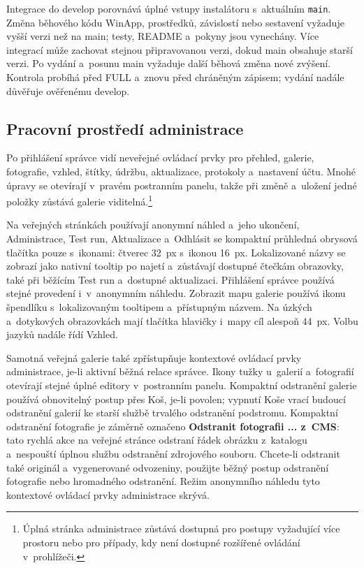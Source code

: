 \documentclass[11pt,a4paper]{article}
\newcommand{\ui}[1]{\textbf{#1}}
\begin{document}
Integrace do develop porovnává úplné vstupy instalátoru s~aktuálním
\texttt{main}. Změna běhového kódu WinApp, prostředků, závislostí nebo sestavení
vyžaduje vyšší verzi než na main; testy, README a~pokyny jsou vynechány.
Více integrací může zachovat stejnou připravovanou verzi, dokud main obsahuje
starší verzi. Po vydání a~posunu main vyžaduje další běhová změna nové zvýšení.
Kontrola probíhá před FULL a~znovu před chráněným zápisem; vydání nadále
důvěřuje
ověřenému develop.

\subsection{Pracovní prostředí administrace}

Po přihlášení správce vidí neveřejné ovládací prvky pro přehled, galerie,
fotografie, vzhled, štítky, údržbu, aktualizace, protokoly a~nastavení účtu.
Mnohé úpravy se otevírají v~pravém postranním panelu, takže při změně a~uložení
jedné položky zůstává galerie viditelná.\footnote{Úplná stránka administrace
zůstává dostupná pro postupy vyžadující více prostoru nebo pro případy, kdy není
dostupné rozšířené ovládání v~prohlížeči.}

Na veřejných stránkách používají anonymní náhled a~jeho ukončení, Administrace,
Test run, Aktualizace a~Odhlásit se kompaktní průhledná obrysová tlačítka pouze
s~ikonami: čtverec 32~px s~ikonou 16~px. Lokalizované názvy se zobrazí jako
nativní tooltip po najetí a~zůstávají dostupné čtečkám obrazovky, také při
běžícím
Test run a~dostupné aktualizaci. Přihlášení správce používá stejné provedení
i~v~anonymním náhledu. Zobrazit mapu galerie používá ikonu špendlíku
s~lokalizovaným tooltipem a~přístupným názvem. Na úzkých a~dotykových
obrazovkách
mají tlačítka hlavičky i~mapy cíl alespoň 44~px. Volbu jazyků nadále řídí
Vzhled.

Samotná veřejná galerie také zpřístupňuje kontextové ovládací prvky
administrace, je-li aktivní běžná relace správce. Ikony tužky u~galerií
a~fotografií otevírají stejné úplné editory v~postranním panelu. Kompaktní
odstranění galerie používá obnovitelný postup přes Koš, je-li povolen; vypnutí
Koše vrací budoucí odstranění galerií ke starší službě trvalého odstranění
podstromu. Kompaktní odstranění fotografie je záměrně označeno \ui{Odstranit
fotografii ... z~CMS}: tato rychlá akce na veřejné stránce odstraní řádek
obrázku z~katalogu a~nespouští úplnou službu odstranění zdrojového souboru.
Chcete-li odstranit také originál a~vygenerované odvozeniny, použijte běžný
postup odstranění fotografie nebo hromadného odstranění. Režim anonymního
náhledu tyto kontextové ovládací prvky administrace skrývá.
\end{document}
